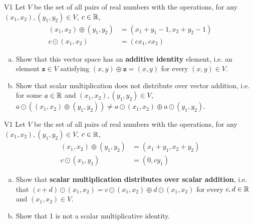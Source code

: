 \begin{problem}{V1}
Let \(V\) be the set of all pairs of real numbers with the operations, for any \((x_1,x_2), (y_1,y_2) \in V\), \(c\in \mathbb{R}\),
\begin{align*}
(x_1,x_2) \oplus (y_1,y_2) &= (x_1+y_1-1,x_2+y_2-1) \\
c \odot (x_1,x_2) &= (cx_1, cx_2)
\end{align*}
\begin{enumerate}[(a)]
\item Show that this vector space has an \textbf{additive identity} element, i.e. an element
      \(\mathbf{z} \in V\) satisfying \((x,y)\oplus\mathbf{z}=(x,y)\) for every \((x,y) \in V\).
\item Show that scalar multiplication does not distribute over vector addition, i.e. for some \(a \in \mathbb{R}\) and \( (x_1,x_2), (y_1,y_2) \in V\), \(a \odot \left( (x_1,x_2)\oplus (y_1,y_2) \right) \neq a \odot (x_1,x_2) \oplus a \odot (y_1,y_2) \).
\end{enumerate}
\end{problem}

\begin{problem}{V1}
Let \(V\) be the set of all pairs of real numbers with the operations, for any \((x_1,x_2), (y_1,y_2) \in V\), \(c\in \mathbb{R}\),
\begin{align*}
(x_1,x_2) \oplus (y_1,y_2) &= (x_1+y_1,x_2+y_2) \\
c \odot (x_1,y_1) &= (0, cy_1)
\end{align*}
\begin{enumerate}[(a)]
\item Show that \textbf{scalar multiplication
      distributes over scalar addition}, i.e. that
      \((c+d)\odot(x_1,x_2)=
      c\odot(x_1,x_2) \oplus d\odot(x_1,x_2)\) for every \(c,d \in \mathbb{R}\) and \( (x_1,x_2) \in V\).
\item Show that 1 is not a scalar multiplicative identity.
\end{enumerate}
\end{problem}


